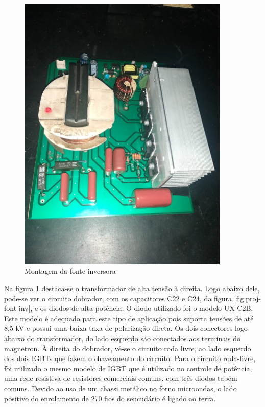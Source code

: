 \begin{figure}[H]
    \centering
    \includegraphics[width=0.9\textwidth]{./dados/figuras/montagem-inverter}
    \caption{Montagem da fonte inversora}
    \label{fig:figura-montagem-inverter}
\end{figure}

Na figura \ref{fig:figura-montagem-inverter} destaca-se o transformador de alta tensão à direita. Logo abaixo dele, pode-se ver o circuito dobrador, com os capacitores C22 e C24, da figura \ref{fig:proj-font-inv}, e os diodos de alta potência. O diodo utilizado foi o modelo UX-C2B. Este modelo é adequado para este tipo de aplicação pois suporta tensões de até 8,5 kV e possui uma baixa taxa de polarização direta. Os dois conectores logo abaixo do transformador, do lado esquerdo são conectados aos terminais do magnetron. À direita do dobrador, vê-se o circuito roda livre, ao lado esquerdo dos dois IGBTs que fazem o chaveamento do circuito. Para o circuito roda-livre, foi utilizado o mesmo modelo de IGBT que é utilizado no controle de potência, uma rede resistiva de resistores comerciais comuns, com três diodos tabém comuns. Devido ao uso de um chassi metálico no forno microondas, o lado positivo do enrolamento de 270 fios do sencudário é ligado ao terra. 

